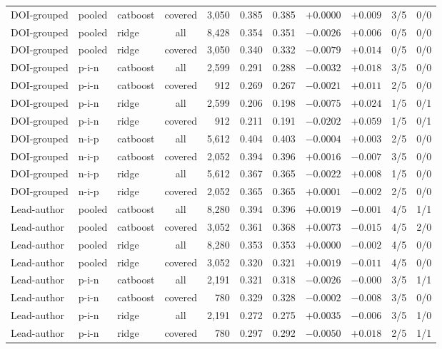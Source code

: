 \documentclass[10pt]{article}
\begin{document}
{\begin{longtable}{lllcrcccccc}
DOI-grouped & pooled & catboost & covered & 3,050 & 0.385 & 0.385 & $+0.0000$ & $+0.009$ & 3/5 & 0/0\\
DOI-grouped & pooled & ridge & all & 8,428 & 0.354 & 0.351 & $-0.0026$ & $+0.006$ & 0/5 & 0/0\\
DOI-grouped & pooled & ridge & covered & 3,050 & 0.340 & 0.332 & $-0.0079$ & $+0.014$ & 0/5 & 0/0\\
DOI-grouped & p-i-n & catboost & all & 2,599 & 0.291 & 0.288 & $-0.0032$ & $+0.018$ & 3/5 & 0/0\\
DOI-grouped & p-i-n & catboost & covered & 912 & 0.269 & 0.267 & $-0.0021$ & $+0.011$ & 2/5 & 0/0\\
DOI-grouped & p-i-n & ridge & all & 2,599 & 0.206 & 0.198 & $-0.0075$ & $+0.024$ & 1/5 & 0/1\\
DOI-grouped & p-i-n & ridge & covered & 912 & 0.211 & 0.191 & $-0.0202$ & $+0.059$ & 1/5 & 0/1\\
DOI-grouped & n-i-p & catboost & all & 5,612 & 0.404 & 0.403 & $-0.0004$ & $+0.003$ & 2/5 & 0/0\\
DOI-grouped & n-i-p & catboost & covered & 2,052 & 0.394 & 0.396 & $+0.0016$ & $-0.007$ & 3/5 & 0/0\\
DOI-grouped & n-i-p & ridge & all & 5,612 & 0.367 & 0.365 & $-0.0022$ & $+0.008$ & 1/5 & 0/0\\
DOI-grouped & n-i-p & ridge & covered & 2,052 & 0.365 & 0.365 & $+0.0001$ & $-0.002$ & 2/5 & 0/0\\
Lead-author & pooled & catboost & all & 8,280 & 0.394 & 0.396 & $+0.0019$ & $-0.001$ & 4/5 & 1/1\\
Lead-author & pooled & catboost & covered & 3,052 & 0.361 & 0.368 & $+0.0073$ & $-0.015$ & 4/5 & 2/0\\
Lead-author & pooled & ridge & all & 8,280 & 0.353 & 0.353 & $+0.0000$ & $-0.002$ & 4/5 & 0/0\\
Lead-author & pooled & ridge & covered & 3,052 & 0.320 & 0.321 & $+0.0019$ & $-0.011$ & 4/5 & 0/0\\
Lead-author & p-i-n & catboost & all & 2,191 & 0.321 & 0.318 & $-0.0026$ & $-0.000$ & 3/5 & 1/1\\
Lead-author & p-i-n & catboost & covered & 780 & 0.329 & 0.328 & $-0.0002$ & $-0.008$ & 3/5 & 0/0\\
Lead-author & p-i-n & ridge & all & 2,191 & 0.272 & 0.275 & $+0.0035$ & $-0.006$ & 3/5 & 1/0\\
Lead-author & p-i-n & ridge & covered & 780 & 0.297 & 0.292 & $-0.0050$ & $+0.018$ & 2/5 & 1/1\\

\end{longtable}}
\end{document}
